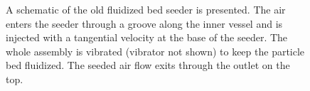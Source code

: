 \begin{figure}

\caption[Schematic of the old seeder design]{A schematic of the old fluidized bed seeder is presented. The air enters the seeder through a groove along the inner vessel and is injected with a tangential velocity at the base of the seeder. The whole assembly is vibrated (vibrator not shown) to keep the particle bed fluidized. The seeded air flow exits through the outlet on the top.}

\label{fig:oldSeeder}

\end{figure}

